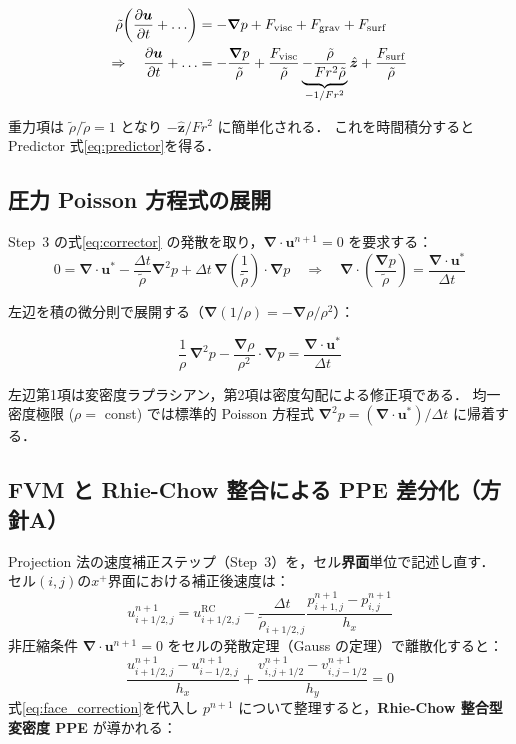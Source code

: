 \documentclass[12pt, a4paper, titlepage]{article}
\newcommand{\jp}[1]{{\normalfont\jpfont #1}}
\newcommand{\pd}[2]{\dfrac{\partial #1}{\partial #2}}
\newcommand{\bu}{\bm{u}}
\newcommand{\bnabla}{\bm{\nabla}}
\begin{document}
\begin{align}
  \tilde\rho\!\left(\pd{\bu}{t} + \ldots\right) &= -\bnabla p + F_{\mathrm{visc}} + F_{\mathrm{grav}} + F_{\mathrm{surf}} \notag\\
  \Rightarrow\quad
  \pd{\bu}{t} + \ldots &= -\frac{\bnabla p}{\tilde\rho} + \frac{F_{\mathrm{visc}}}{\tilde\rho}
    \underbrace{- \frac{\tilde\rho}{Fr^2\tilde\rho}}_{-1/Fr^2}\hat{\bm{z}} + \frac{F_{\mathrm{surf}}}{\tilde\rho}
\end{align}

\jp{重力項は $\tilde\rho/\tilde\rho = 1$ となり $-\hat{\bm{z}}/Fr^2$ に簡単化される．
これを時間積分すると Predictor 式\eqref{eq:predictor}を得る．}

\subsection{\jp{圧力 Poisson 方程式の展開}}

\jp{Step~3 の式\eqref{eq:corrector} の発散を取り，$\bnabla\cdot\bu^{n+1}=0$ を要求する：}
\begin{equation}
  0 = \bnabla\cdot\bu^* - \frac{\Delta t}{\tilde\rho}\bnabla^2 p
    + \Delta t\,\bnabla\!\left(\frac{1}{\tilde\rho}\right)\cdot\bnabla p
  \quad\Rightarrow\quad
  \bnabla\cdot\!\left(\frac{\bnabla p}{\tilde\rho}\right) = \frac{\bnabla\cdot\bu^*}{\Delta t}
\end{equation}

\jp{左辺を積の微分則で展開する（$\bnabla(1/\rho) = -\bnabla\rho/\rho^2$）：}
\begin{tcolorbox}[mybox, title={\jp{展開された変密度 Poisson 方程式}}]
\begin{equation}
  \frac{1}{\rho}\,\bnabla^2 p
  - \frac{\bnabla\rho}{\rho^2}\cdot\bnabla p
  = \frac{\bnabla\cdot\bu^*}{\Delta t}
  \label{eq:PPE_expanded}
\end{equation}
\end{tcolorbox}
\jp{左辺第1項は変密度ラプラシアン，第2項は密度勾配による修正項である．
均一密度極限 ($\rho=$ const) では標準的 Poisson 方程式 $\bnabla^2 p = (\bnabla\cdot\bu^*)/\Delta t$ に帰着する．}

\subsection{\jp{FVM と Rhie-Chow 整合による PPE 差分化（方針A）}}
\label{sec:PPE_FVM}

\jp{Projection 法の速度補正ステップ（Step~3）を，セル\textbf{界面}単位で記述し直す．
セル$(i,j)$の$x^+$界面における補正後速度は：}
\begin{equation}
  u^{n+1}_{i+1/2,j} = u^{\mathrm{RC}}_{i+1/2,j}
    - \frac{\Delta t}{\tilde\rho_{i+1/2,j}}\frac{p^{n+1}_{i+1,j}-p^{n+1}_{i,j}}{h_x}
  \label{eq:face_correction}
\end{equation}
\jp{非圧縮条件 $\bnabla\!\cdot\!\bu^{n+1}=0$ をセルの発散定理（Gauss の定理）で離散化すると：}
\begin{equation}
  \frac{u^{n+1}_{i+1/2,j}-u^{n+1}_{i-1/2,j}}{h_x}
  + \frac{v^{n+1}_{i,j+1/2}-v^{n+1}_{i,j-1/2}}{h_y} = 0
\end{equation}
\jp{式\eqref{eq:face_correction}を代入し $p^{n+1}$ について整理すると，\textbf{Rhie-Chow 整合型変密度 PPE} が導かれる：}
\end{document}
